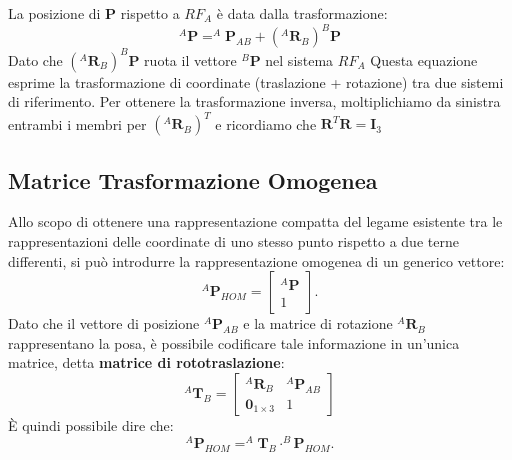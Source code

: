 ﻿\documentclass[11pt, a4paper]{article}
\begin{document}
La posizione di \textbf{P} rispetto a $RF_{A}$ è data dalla trasformazione:
\[
    ^{A}\mathbf{P} = ^{A}\mathbf{P}_{AB} + (^{A}\mathbf{R}_{B}) ^{B}\mathbf{P}
\]
Dato che \((^{A}\mathbf{R}_{B}) ^{B}\mathbf{P}\) ruota il vettore $^{B}\mathbf{P}$ nel sistema \(RF_A\)
Questa equazione esprime la trasformazione di coordinate (traslazione + rotazione) tra due sistemi di riferimento. Per ottenere la trasformazione inversa, moltiplichiamo da sinistra entrambi i membri per $(^{A}\mathbf{R}_{B})^T$ e ricordiamo che $\mathbf{R}^T \mathbf{R} = \mathbf{I}_3$
\subsection{Matrice Trasformazione Omogenea}
Allo scopo di ottenere una rappresentazione compatta del legame esistente tra le rappresentazioni delle coordinate di uno stesso punto rispetto a due terne differenti, si può introdurre la rappresentazione omogenea di un generico vettore:
\[
    ^{A}\mathbf{P}_{HOM} =
        \begin{bmatrix}
            ^{A}\mathbf{P} \\
            1
        \end{bmatrix}.
\]
Dato che il vettore di posizione $ ^{A}\mathbf{P}_{AB} $ e la matrice di rotazione $ ^{A}\mathbf{R}_{B} $ rappresentano la posa, è possibile codificare tale informazione in un'unica matrice, detta \textbf{matrice di rototraslazione}:
\[
    ^{A}\mathbf{T}_{B} =
    \begin{bmatrix}
        ^{A}\mathbf{R}_{B} & ^{A}\mathbf{P}_{AB} \\
        \mathbf{0}_{1 \times 3} & 1
    \end{bmatrix}
\]
È quindi possibile dire che:
\[
    ^{A}\mathbf{P}_{HOM} = ^{A}\mathbf{T}_{B} \cdot ^{B}\mathbf{P}_{HOM}.
\]
\end{document}
